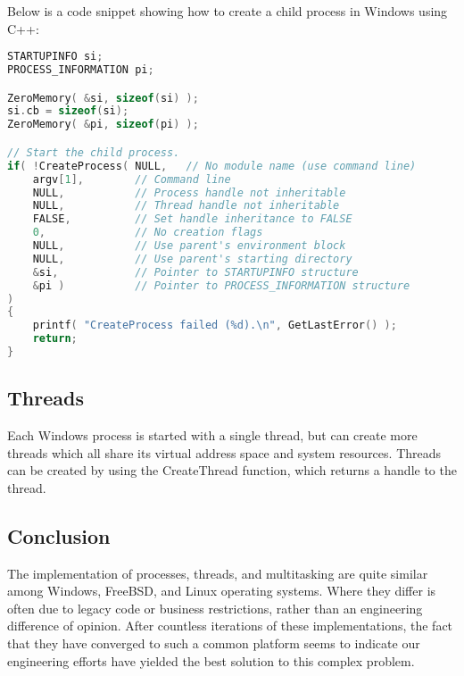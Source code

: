 \documentclass[letterpaper,draftclsnofoot,10pt,onecolumn,titlepage]{IEEEtran}\usepackage[margin=0.75in]{geometry}
\begin{document}
    Below is a code snippet showing how to create a child process in Windows using C++:
\begin{lstlisting}[language=C++]
STARTUPINFO si;
PROCESS_INFORMATION pi;

ZeroMemory( &si, sizeof(si) );
si.cb = sizeof(si);
ZeroMemory( &pi, sizeof(pi) );

// Start the child process.
if( !CreateProcess( NULL,   // No module name (use command line)
    argv[1],        // Command line
    NULL,           // Process handle not inheritable
    NULL,           // Thread handle not inheritable
    FALSE,          // Set handle inheritance to FALSE
    0,              // No creation flags
    NULL,           // Use parent's environment block
    NULL,           // Use parent's starting directory
    &si,            // Pointer to STARTUPINFO structure
    &pi )           // Pointer to PROCESS_INFORMATION structure
)
{
    printf( "CreateProcess failed (%d).\n", GetLastError() );
    return;
}
\end{lstlisting}

    \subsection{Threads}
    Each Windows process is started with a single thread, but can create more threads which all share its virtual
    address space and system resources. Threads can be created by using the CreateThread function, which returns a
    handle to the thread.
    
    
    \subsection{Conclusion}
    The implementation of processes, threads, and multitasking are quite similar among Windows, FreeBSD, and Linux 
    operating systems. Where they differ is often due to legacy code or business restrictions, rather than an 
    engineering difference of opinion. After countless iterations of these implementations, the fact that they 
    have converged to such a common platform seems to indicate our engineering efforts have yielded the best 
    solution to this complex problem.
\end{document}
